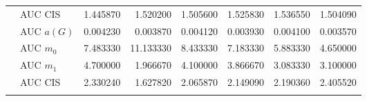 \begin{table}[htbp]
\begin{tabular}{llrrrrrr}
    & AUC CIS & 1.445870 & 1.520200 & 1.505600 & 1.525830 & 1.536550 & 1.504090 \\
    \addlinespace
    \multirow{4}{*}{random} & AUC $a(G)$ & 0.004230 & 0.003870 & 0.004120 & 0.003930 & 0.004100 & 0.003570 \\
    & AUC $m_0$ & 7.483330 & 11.133330 & 8.433330 & 7.183330 & 5.883330 & 4.650000 \\
    & AUC $m_1$ & 4.700000 & 1.966670 & 4.100000 & 3.866670 & 3.083330 & 3.100000 \\
    & AUC CIS & 2.330240 & 1.627820 & 2.065870 & 2.149090 & 2.190360 & 2.405520 \\
    \addlinespace
    \bottomrule
  \end{tabular}
\end{table}

